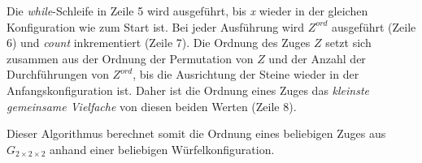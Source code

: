 \documentclass[12pt,a4paper, usenames, dvipsnames]{article}
\theoremstyle{mystyle}
\theoremstyle{definition}
\newcommand{\Gtwo}{\ensuremath{G_{2\times 2\times 2}}}
\begin{document}
Die \textit{while}-Schleife in Zeile 5 wird ausgeführt, bis \textit{x} wieder in der gleichen Konfiguration wie zum Start ist. Bei jeder Ausführung wird $Z^\textit{ord}$ ausgeführt (Zeile 6) und \textit{count} inkrementiert (Zeile 7).
Die Ordnung des Zuges $Z$ setzt sich zusammen aus der Ordnung der Permutation von $Z$ und der Anzahl der Durchführungen von $Z^\textit{ord}$, bis die Ausrichtung der Steine wieder in der Anfangskonfiguration ist. Daher ist die Ordnung eines Zuges das \textit{kleinste gemeinsame Vielfache} von diesen beiden Werten (Zeile 8).

Dieser Algorithmus berechnet somit die Ordnung eines beliebigen Zuges aus $\Gtwo$ anhand einer beliebigen Würfelkonfiguration.



%
%
%
%
%
%
%
%
%
%
%
%
%
%
%
%
%
%
%
%



%
%
%
%
%
%
%
%
%
%
%
%
%
%
%
%
%
%
%
%
\newpage
\end{document}

